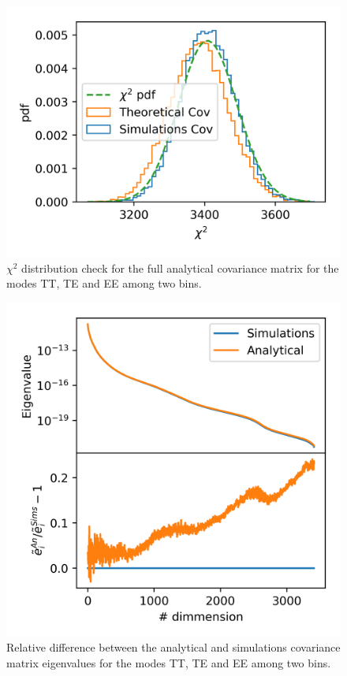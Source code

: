 \documentclass[a4paper,11pt]{article}
\begin{document}
\begin{figure} %
  \centering
  \includegraphics[width=\columnwidth]{./figures/run_sph_2b_same_mask_Efstathiou_TTTEEE_Full_chi2.png}
  \caption{$\chi^2$ distribution check for the full analytical covariance
    matrix for the modes TT, TE and EE among two bins.}
  \label{fig:TTTEEE_chi2}
\end{figure}

\begin{figure} %
  \centering
  \includegraphics[width=\columnwidth]{./figures/run_sph_2b_same_mask_Efstathiou_TTTEEE_Full_reldev_eigval.png}
  \caption{Relative difference between the analytical and simulations
    covariance matrix eigenvalues for the modes TT, TE and EE among two bins.}
  \label{fig:TTTEEE_eigv}
\end{figure}
\end{document}
